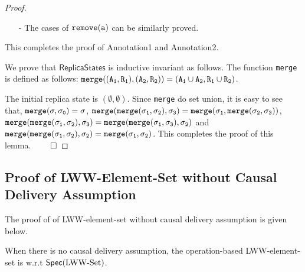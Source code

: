 \begin {proof}
\begin{itemize}
\begin{itemize}
    \item[-] If $\alabel \notin \alabelset_S$: Let $\alabelset'_S$ be the $\alabelset$ of $S'$. We can see that, $\alabelset'_S = \alabelset_S \cup \alabel \cup \avisord^{-1}(\alabel)$. By Annotation1 of $(A_a,R_a)$ and Annotation2 of $S$, we can see that Annotation2 holds for $S'$.
    \end{itemize}

\item[-] The cases of $\alabelshort[{\tt remove}]{a}$ can be similarly proved.
\end{itemize}

This completes the proof of Annotation1 and Annotation2.

We prove that $\mathsf{ReplicaStates}$ is inductive invariant as follows. The function {\tt merge} is defined as follows: $\alabelshort[{\tt merge}]{(A_1,R_1),(A_2,R_2)} = (A_1 \cup A_2, R_1 \cup R_2)$.

The initial replica state is $(\emptyset,\emptyset)$. Since {\tt merge} do set union, it is easy to see that, $\alabelshort[{\tt merge}]{\astate,\astate_0} = \astate$, $\alabelshort[{\tt merge}]{\alabelshort[{\tt merge}]{\astate_1,\astate_2},\astate_3} = \alabelshort[{\tt merge}]{\astate_1, \alabelshort[{\tt merge}]{\astate_2,\astate_3}}$, $\alabelshort[{\tt merge}]{\alabelshort[{\tt merge}]{\astate_1,\astate_2},\astate_3} = \alabelshort[{\tt merge}]{\alabelshort[{\tt merge}]{\astate_1,\astate_3},\astate_2}$ and $\alabelshort[{\tt merge}]{\alabelshort[{\tt merge}]{\astate_1,\astate_2},\astate_2} = \alabelshort[{\tt merge}]{\astate_1,\astate_2}$. This completes the proof of this lemma. $\qed$
\end {proof}






\subsection{Proof of LWW-Element-Set without Causal Delivery Assumption}
\label{subsec:proof of LWW-element-set without causal delivery assumption}

The proof of \crdtlin{} of LWW-element-set without causal delivery assumption is given below.

\begin{lemma}
\label{lemma:when there is no causal delivery assumption, operation-based LWW-element-set is correct is still correct}
When there is no causal delivery assumption, the operation-based LWW-element-set is \crdtlinearizable{} w.r.t $\mathsf{Spec}(\text{LWW\text{-}Set})$.
\end{lemma}


